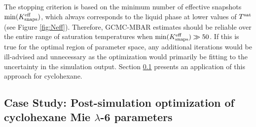 \documentclass[journal=jced,manuscript=article]{achemso}
\begin{document}
The stopping criterion is based on the minimum number of effective snapshots $\min(K_{\rm snaps}^{\rm eff})$, which always corresponds to the liquid phase at lower values of $T^{\rm sat}$ (see Figure \ref{fig:Neff}). Therefore, GCMC-MBAR estimates should be reliable over the entire range of saturation temperatures when $\min(K_{\rm snaps}^{\rm eff}) \gg 50$. If this is true for the optimal region of parameter space, any additional iterations would be ill-advised and unnecessary as the optimization would primarily be fitting to the uncertainty in the simulation output. Section \ref{sec: Case study} presents an application of this approach for cyclohexane.


%


\subsection{Case Study: Post-simulation optimization of cyclohexane Mie $\lambda$-6 parameters} \label{sec: Case study}

\end{document}
